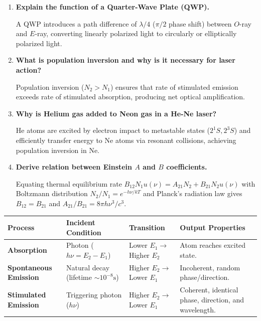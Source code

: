 \documentclass[12pt,a4paper]{article}
\newcommand{\Q}[1]{\textbf{#1}\par\noindent\ignorespaces}
\begin{document}
\begin{tcolorbox}[exambox, title={\textbf{Frequently Asked / Viva Questions}}]
\begin{enumerate}[topsep=0pt, label=\textbf{Q\arabic*.}, itemsep=5pt]
  \item \Q{Explain the function of a Quarter-Wave Plate (QWP).}
  A QWP introduces a path difference of $\lambda/4$ ($\pi/2$ phase shift) between $O$-ray and $E$-ray, converting linearly polarized light to circularly or elliptically polarized light.

  \item \Q{What is population inversion and why is it necessary for laser action?}
  Population inversion ($N_2 > N_1$) ensures that rate of stimulated emission exceeds rate of stimulated absorption, producing net optical amplification.

  \item \Q{Why is Helium gas added to Neon gas in a He-Ne laser?}
  He atoms are excited by electron impact to metastable states ($2^1S, 2^3S$) and efficiently transfer energy to Ne atoms via resonant collisions, achieving population inversion in Ne.

  \item \Q{Derive relation between Einstein $A$ and $B$ coefficients.}
  Equating thermal equilibrium rate $B_{12} N_1 u(\nu) = A_{21} N_2 + B_{21} N_2 u(\nu)$ with Boltzmann distribution $N_2/N_1 = e^{-h\nu/kT}$ and Planck's radiation law gives $B_{12} = B_{21}$ and $A_{21}/B_{21} = 8\pi h\nu^3/c^3$.
\end{enumerate}
\end{tcolorbox}

\begin{tcolorbox}[tikzbox, title={Summary Comparison of Laser Processes}]
\centering
\begin{tabularx}{\linewidth}{|B{3.2cm}|Y|Y|Y|}
\hline
\textbf{Process} & \textbf{Incident Condition} & \textbf{Transition} & \textbf{Output Properties} \\
\hline
\textbf{Absorption} & Photon ($h\nu = E_2 - E_1$) & Lower $E_1 \to$ Higher $E_2$ & Atom reaches excited state. \\
\hline
\textbf{Spontaneous Emission} & Natural decay (lifetime $\sim 10^{-8}\text{s}$) & Higher $E_2 \to$ Lower $E_1$ & Incoherent, random phase/direction. \\
\hline
\textbf{Stimulated Emission} & Triggering photon ($h\nu$) & Higher $E_2 \to$ Lower $E_1$ & Coherent, identical phase, direction, and wavelength. \\
\hline
\end{tabularx}
\end{tcolorbox}
\end{document}
